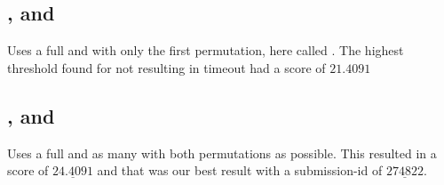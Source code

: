 \subsection{, and }
Uses  a full  and  with only the first permutation, here called . 
The highest threshold found for  not resulting in timeout had a score of $21.4091$

\subsection{, and }
Uses  a full  and as many  with both permutations as possible.
This resulted in a score of $\underline{24.4091}$ and that was our best result with a submission-id of $\underline{274822}$.

